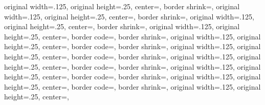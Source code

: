 {{	original width=.125\pgfpageoptionheight,%
	original height=.25\pgfpageoptionwidth,%
	center=\pgfpoint{.25\pgfphysicalwidth}{.125\pgfphysicalheight},%
}%
{%
	border shrink=\pgfpageoptionborder,%
	original width=.125\pgfpageoptionheight,%
	original height=.25\pgfpageoptionwidth,%
	center=\pgfpoint{.5\pgfphysicalwidth}{.125\pgfphysicalheight},%
}%
{%
	border shrink=\pgfpageoptionborder,%
	original width=.125\pgfpageoptionheight,%
	original height=.25\pgfpageoptionwidth,%
	center=\pgfpoint{.75\pgfphysicalwidth}{.125\pgfphysicalheight},%
}%
%
%
  {%
	border shrink=\pgfpageoptionborder,%
	original width=.125\pgfpageoptionheight,%
	original height=.25\pgfpageoptionwidth,%
	center=\pgfpoint{.75\pgfphysicalwidth}{\pgfphysicalheight},%
	border code=\pgfsetlinewidth{.5pt}\pgfstroke,%
  }%
  {%
	border shrink=\pgfpageoptionborder,%
	original width=.125\pgfpageoptionheight,%
	original height=.25\pgfpageoptionwidth,%
	center=\pgfpoint{.5\pgfphysicalwidth}{\pgfphysicalheight},%
	border code=\pgfsetlinewidth{.5pt}\pgfstroke,%
	}%
  {%
	border shrink=\pgfpageoptionborder,%
	original width=.125\pgfpageoptionheight,%
	original height=.25\pgfpageoptionwidth,%
	center=\pgfpoint{.25\pgfphysicalwidth}{\pgfphysicalheight},%
	border code=\pgfsetlinewidth{.5pt}\pgfstroke,%
  }%
  {%
	border shrink=\pgfpageoptionborder,%
	original width=.125\pgfpageoptionheight,%
	original height=.25\pgfpageoptionwidth,%
	center=\pgfpoint{0pt}{\pgfphysicalheight},%
	border code=\pgfsetlinewidth{.5pt}\pgfstroke,%
  }%
  {%
	border shrink=\pgfpageoptionborder,%
	original width=.125\pgfpageoptionheight,%
	original height=.25\pgfpageoptionwidth,%
	center=\pgfpoint{.75\pgfphysicalwidth}{.875\pgfphysicalheight},%
	border code=\pgfsetlinewidth{.5pt}\pgfstroke,%
  }%
  {%
	border shrink=\pgfpageoptionborder,%
	original width=.125\pgfpageoptionheight,%
	original height=.25\pgfpageoptionwidth,%
	center=\pgfpoint{.5\pgfphysicalwidth}{.875\pgfphysicalheight},%
	border code=\pgfsetlinewidth{.5pt}\pgfstroke,%
	}%
  {%
	border shrink=\pgfpageoptionborder,%
	original width=.125\pgfpageoptionheight,%
	original height=.25\pgfpageoptionwidth,%
	center=\pgfpoint{.25\pgfphysicalwidth}{.875\pgfphysicalheight},%
}}
